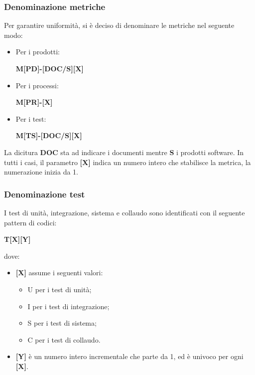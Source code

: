 \subsubsection{Denominazione metriche}
Per garantire uniformità, si è deciso di denominare le metriche nel seguente modo:
\begin{itemize}
    \item Per i prodotti:
          \begin{center}
              \textbf{M[PD]-[DOC/S][X]}
          \end{center}
    \item Per i processi:
          \begin{center}
              \textbf{M[PR]-[X]}
          \end{center}
    \item Per i test:
          \begin{center}
              \textbf{M[TS]-[DOC/S][X]}
          \end{center}
\end{itemize}
La dicitura \textbf{DOC} sta ad indicare i documenti mentre \textbf{S} i prodotti software.
In tutti i casi, il parametro \textbf{[X]} indica un numero intero che stabilisce la metrica, la numerazione inizia da 1.

\subsubsection{Denominazione test}
\label{_denominazioneTest}
I test di unità, integrazione, sistema e collaudo sono identificati con il seguente pattern di codici:
\begin{center}
    \textbf{T[X][Y]}
\end{center}
dove:
\begin{itemize}
    \item \textbf{[X]} assume i seguenti valori:
          \begin{itemize}
              \item U per i test di unità;
              \item I per i test di integrazione;
              \item S per i test di sistema;
              \item C per i test di collaudo.
          \end{itemize}
    \item \textbf{[Y]} è un numero intero incrementale che parte da 1, ed è univoco per ogni \textbf{[X]}.
\end{itemize}

